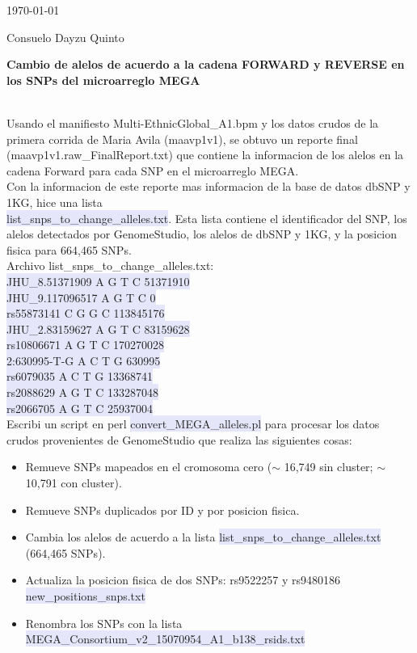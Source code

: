 \documentclass[10pt]{report}
\begin{document}
\today

Consuelo Dayzu Quinto

\begin{center}
\large \textbf{Cambio de alelos de acuerdo a la cadena FORWARD y REVERSE en los SNPs del microarreglo MEGA}
\end{center}
\\

Usando el manifiesto Multi-EthnicGlobal\_A1.bpm  y los datos crudos de la primera corrida de Maria Avila (maavp1v1), se obtuvo un reporte final (maavp1v1.raw\_FinalReport.txt) que contiene la informacion de los alelos en la cadena Forward para cada SNP en el microarreglo MEGA. \\

Con la informacion de este reporte mas informacion de la base de datos dbSNP y 1KG, hice una lista\\
 \colorbox{Lavender}{list\_snps\_to\_change\_alleles.txt}. Esta lista contiene el identificador del SNP, los alelos detectados por GenomeStudio, los alelos de dbSNP y 1KG, y la posicion fisica para 664,465 SNPs. \\

Archivo list\_snps\_to\_change\_alleles.txt:\\
\colorbox{Lavender}{JHU\_8.51371909	A	 G	 T	 C	 51371910}\\
\colorbox{Lavender}{JHU\_9.117096517	A	 G	 T	 C	 0}\\
\colorbox{Lavender}{rs55873141	C	 G	 G	 C	 113845176}	\\
\colorbox{Lavender}{JHU\_2.83159627	A	 G	 T	 C	 83159628}	\\
\colorbox{Lavender}{rs10806671	A	 G	 T	 C	 170270028}	\\
\colorbox{Lavender}{2:630995-T-G	A	 C	 T	 G	 630995}	\\
\colorbox{Lavender}{rs6079035	A	 C	 T	 G	 13368741}	\\
\colorbox{Lavender}{rs2088629	A	 G	 T	 C	 133287048}	\\
\colorbox{Lavender}{rs2066705	A	 G	 T	 C	 25937004}	\\

Escribi un script en perl \colorbox{Lavender}{convert\_MEGA\_alleles.pl} para procesar los datos crudos provenientes de GenomeStudio que realiza las siguientes cosas:
\begin{itemize}
 \item Remueve SNPs mapeados en el cromosoma cero ($\sim$ 16,749 sin cluster; $\sim$ 10,791 con cluster).
 \item Remueve SNPs duplicados por ID y por posicion fisica. 
 \item Cambia los alelos de acuerdo a la lista \colorbox{Lavender}{list\_snps\_to\_change\_alleles.txt} (664,465 SNPs).
 \item Actualiza la posicion fisica de dos SNPs: rs9522257 y rs9480186 \colorbox{Lavender}{new\_positions\_snps.txt}
 \item Renombra los SNPs con la lista \colorbox{Lavender}{MEGA\_Consortium\_v2\_15070954\_A1\_b138\_rsids.txt}
 \end{itemize}
\end{document}
